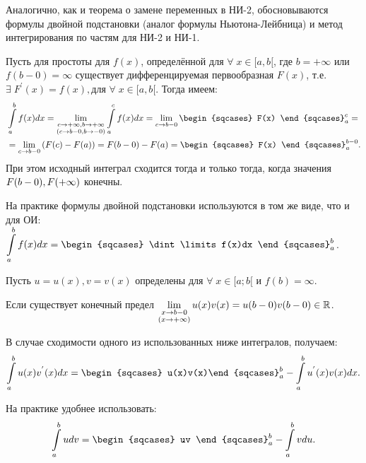 \begin{col-answer-preambule}
		Аналогично, как и теорема о замене переменных в НИ-2, обосновываются формулы двойной подстановки (аналог формулы Ньютона-Лейбница) и метод интегрирования по частям для НИ-2 и НИ-1.
\end{col-answer-preambule}


Пусть для простоты для $f(x)$, определённой для $\forall \; x \in [a, b[$, где $b = + \infty$ или $f(b - 0) = \infty$ существует дифференцируемая первообразная $F(x)$, т.е. $\exists \; F^{'}(x) = f(x), \text{для }\forall \; x \in [a, b[$. Тогда имеем:
\begin{equation*}
\begin{split}
&\dint\limits_{a}^{b} f(x)dx = \lim\limitslimits{c \to + \infty, b \to + \infty}{(c \to b-0,b \to -0)} \dint\limits_{a}^{c} f(x)dx = \lim\limits_{c\to b-0} \begin{sqcases} F(x) \end{sqcases}^{c}_{a} = \\
& =\lim\limits_{c\to b-0} \left(F(c) - F(a)\right) = F(b-0) - F(a) = \begin{sqcases} F(x) \end{sqcases}^{b-0}_{a}.
\end{split}
\end{equation*}
При этом исходный интеграл сходится тогда и только тогда, когда значения $\linebreak F(b-0), F(+\infty)$ конечны.

На практике формулы двойной подстановки используются в том же виде, что и для ОИ: $\dint\limits_{a}^{b} f(x)dx = \begin{sqcases} \dint\limits f(x)dx \end{sqcases}^b_a$.

Пусть $u = u(x), v = v(x)$ определены для $\forall \; x \in [a; b[$ и $f(b) = \infty$.

Если существует конечный предел $\lim\limits_{ \substack{ x \to b-0 \\ (x\to +\infty) } } u(x) v(x) = u(b-0)v(b-0) \in \mathbb{R}$.

В случае сходимости одного из использованных ниже интегралов, получаем:
\begin{equation*}
\dint\limits_{a}^{b} u(x) v^{'}(x)dx = \begin{sqcases} u(x)v(x)\end{sqcases}^b_a - \dint\limits_{a}^{b} u^{'}(x) v(x)dx.
\end{equation*}

На практике удобнее использовать:
\begin{equation*}
\dint\limits_{a}^{b} udv = \begin{sqcases} uv \end{sqcases}^b_a - \dint\limits_{a}^{b} vdu.
\end{equation*}